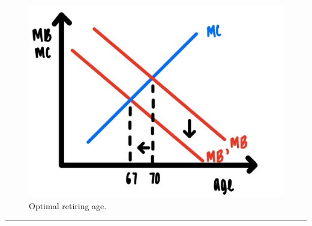 \documentclass[
]{book}
\begin{document}
\begin{figure}

{\centering \includegraphics[width=0.75\linewidth]{img/rationalchoice/fig7} 

}

\caption{Optimal retiring age.}\label{fig:rationalchoice07}
\end{figure}

\begin{center}\rule{0.5\linewidth}{0.5pt}\end{center}
\end{document}
